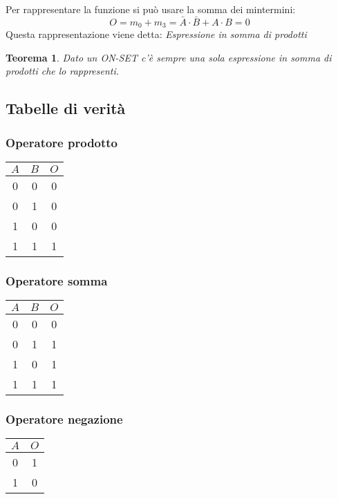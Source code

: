\documentclass[a4paper]{article}
\newtheorem{theorem}{Teorema}
\theoremstyle{break}
\theoremstyle{break}
\theoremstyle{break}
\theoremstyle{break}
\begin{document}
\begin{example}
Per rappresentare la funzione si può usare la somma dei mintermini:
\[
O = m_0 + m_3 = \bar{A} \cdot \bar{B} + A \cdot B = 0
\] 
Questa rappresentazione viene detta: \emph{Espressione in somma di prodotti} 
\begin{theorem}
   Dato un ON-SET c'è sempre una sola espressione in somma di prodotti che lo
   rappresenti.
\end{theorem}
\end{example}

\subsection{Tabelle di verità}
\subsubsection{Operatore prodotto}
\begin{center}
	\begin{tabular}{c|c|c}
		\( A \) & \( B \) & \( O \) \\
		\hline
		0            & 0           & 0                       \\
		0            & 1           & 0                       \\
		1            & 0           & 0                       \\
		1            & 1           & 1                       \\
	\end{tabular}
\end{center}

\subsubsection{Operatore somma}
\begin{center}
	\begin{tabular}{c|c|c}
		\( A \) & \( B \) & \( O \) \\
		\hline
		0            & 0           & 0                       \\
		0            & 1           & 1                       \\
		1            & 0           & 1                       \\
		1            & 1           & 1                       \\
	\end{tabular}
\end{center}

\subsubsection{Operatore negazione}
\begin{center}
	\begin{tabular}{c|c}
		\( A \) & \( O \) \\
		\hline
		0            & 1 \\
		1            & 0 \\
	\end{tabular}
\end{center}
\end{document}

